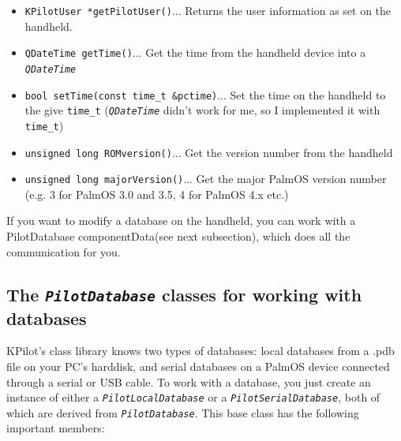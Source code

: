 \documentclass[10pt,a4paper]{article}
\newcommand{\code}[1]{{\small\texttt{#1}}}
\newcommand{\class}[1]{{\small\em\texttt{#1}}}
\begin{document}
\begin{itemize}
\item
    \code{KPilotUser *getPilotUser()}\qquad ... Returns the user 
    information as set on the handheld.


\item
    \code{QDateTime getTime()}\qquad ... Get the time from the handheld 
    device into a \class{QDateTime}
\item
    \code{bool setTime(const time\_t \&pctime)}\qquad ... Set the time 
    on the handheld to the give \code{time\_t} (\class{QDateTime} didn't 
    work for me, so I implemented it with \code{time\_t})


\item
    \code{unsigned long ROMversion()}\qquad ... Get the version number 
    from the handheld
\item
    \code{unsigned long majorVersion()}\qquad ... Get the major PalmOS 
    version number (e.g. 3 for PalmOS 3.0 and 3.5, 4 for PalmOS 4.x etc.)

\end{itemize}

If you want to modify a database on the handheld, you can work with a 
PilotDatabase componentData(see next subsection), which does all the 
communication for you.



\subsection{The \class{PilotDatabase} classes for working with databases}
KPilot's class library knows two types of databases: local databases from 
a .pdb file on your PC's harddisk, and serial databases on a PalmOS device 
connected through a serial or USB cable. To work with a database, you just 
create an instance of either a \class{PilotLocalDatabase} or a 
\class{PilotSerialDatabase}, both of which are derived from 
\class{PilotDatabase}. This base class has the following important members:
\end{document}

